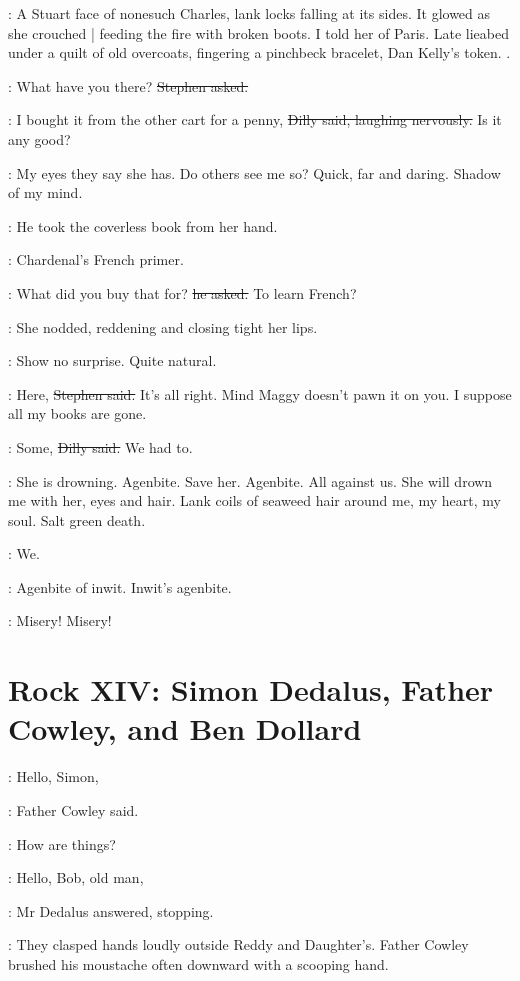 \StephenInt:
A Stuart face of nonesuch Charles,
lank locks falling at its sides.
It glowed as she crouched |
feeding the fire with broken boots.
I told her of Paris.
Late lieabed under a quilt of old overcoats,
fingering a pinchbeck bracelet,
Dan Kelly's token.
.

\Stephen:
What have you there?
\sout{Stephen asked.}

\dilly:
I bought it from the other cart for a penny,
\sout{Dilly said, laughing nervously.}
Is it any good?

\StephenInt:
My eyes they say she has.
Do others see me so?
Quick, far and daring.
Shadow of my mind.

:
He took the coverless book from her hand.

\StephenInt:
Chardenal's French primer.

\Stephen:
What did you buy that for?
\sout{he asked.}
To learn French?

:
She nodded,
reddening and closing tight her lips.

\StephenInt:
Show no surprise.
Quite natural.

\Stephen:
Here,
\sout{Stephen said.}
It's all right.
Mind Maggy doesn't pawn it on you.
I suppose all my books are gone.

\dilly:
Some,
\sout{Dilly said.}
We had to.

\StephenInt:
She is drowning.
Agenbite.
Save her.
Agenbite.
All against us.
She will drown me with her,
eyes and hair.
Lank coils of seaweed hair around me,
my heart,
my soul.
Salt green death.

\StephenInt:
We.

\StephenInt:
Agenbite of inwit.
Inwit's agenbite.

\StephenInt:
Misery!
Misery!


\section*{Rock XIV: Simon Dedalus, Father Cowley, and Ben Dollard}


\cowley:
Hello, Simon,

:
Father Cowley said.

\cowley:
How are things?

\simon:
Hello, Bob, old man,

:
Mr Dedalus answered,
stopping.

:
They clasped hands loudly outside Reddy and Daughter's.
Father Cowley brushed his moustache often downward
with a scooping hand.

